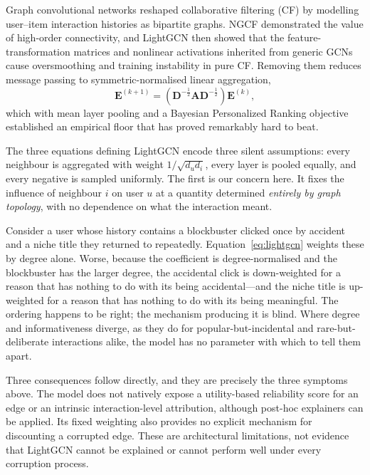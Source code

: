 \documentclass[a4paper,fleqn,longmktitle]{cas-dc}
\begin{document}
Graph convolutional networks reshaped collaborative filtering (CF) by
modelling user--item interaction histories as bipartite graphs. NGCF
\citep{wang2019ngcf} demonstrated the value of high-order connectivity, and
LightGCN \citep{he2020lightgcn} then showed that the feature-transformation
matrices and nonlinear activations inherited from generic GCNs cause
oversmoothing and training instability in pure CF. Removing them reduces
message passing to symmetric-normalised linear aggregation,
\begin{equation}
\mathbf{E}^{(k+1)} = \left( \mathbf{D}^{-\frac{1}{2}} \mathbf{A}
\mathbf{D}^{-\frac{1}{2}} \right) \mathbf{E}^{(k)},
\label{eq:lightgcn}
\end{equation}
which with mean layer pooling and a Bayesian Personalized Ranking objective
\citep{rendle2009bpr} established an empirical floor that has proved
remarkably hard to beat.

The three equations defining LightGCN encode three silent assumptions: every
neighbour is aggregated with weight $1/\sqrt{d_u d_i}$, every layer is pooled
equally, and every negative is sampled uniformly. The first is our concern
here. It fixes the influence of neighbour $i$ on user $u$ at a quantity
determined \emph{entirely by graph topology}, with no dependence on what the
interaction meant.

Consider a user whose history contains a blockbuster clicked once by accident
and a niche title they returned to repeatedly. Equation~\eqref{eq:lightgcn}
weights these by degree alone. Worse, because the coefficient is
degree-normalised and the blockbuster has the larger degree, the accidental
click is down-weighted for a reason that has nothing to do with its being
accidental---and the niche title is up-weighted for a reason that has nothing
to do with its being meaningful. The ordering happens to be right; the
mechanism producing it is blind. Where degree and informativeness diverge, as
they do for popular-but-incidental and rare-but-deliberate interactions alike,
the model has no parameter with which to tell them apart.

Three consequences follow directly, and they are precisely the three symptoms
above. The model does not natively expose a utility-based reliability score
for an edge or an intrinsic interaction-level attribution, although post-hoc
explainers can be applied. Its fixed weighting also provides no explicit
mechanism for discounting a corrupted edge. These are architectural
limitations, not evidence that LightGCN cannot be explained or cannot perform
well under every corruption process.
\end{document}
